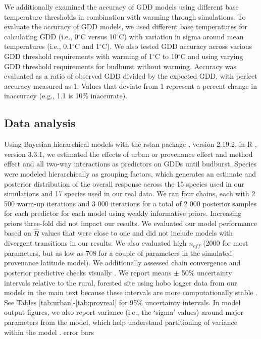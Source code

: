 \documentclass{article}\usepackage[]{graphicx}\usepackage[]{color}
\begin{document}
We additionally examined the accuracy of GDD models using different base temperature thresholds in combination with warming through simulations. To evaluate the accuracy of GDD models, we used different base temperatures for calculating GDD (i.e., 0$^{\circ}$C versus 10$^{\circ}$C) with variation in sigma around mean temperatures (i.e., 0.1$^{\circ}$C and 1$^{\circ}$C). We also tested GDD accuracy across various GDD threshold requirements with warming of 1$^{\circ}$C to 10$^{\circ}$C and using varying GDD threshold requirements for budburst without warming. Accuracy was evaluated as a ratio of observed GDD divided by the expected GDD, with perfect accuracy measured as 1. Values that deviate from 1 represent a percent change in inaccuracy (e.g., 1.1 is 10\% inaccurate).  

\subsection*{Data analysis}
Using Bayesian hierarchical models with the rstan package \citep{rstan2019}, version 2.19.2,  in R \citep{R}, version 3.3.1, we estimated the effects of urban or provenance effect and method effect and all two-way interactions as predictors on GDDs until budburst. Species were modeled hierarchically as grouping factors, which generates an estimate and posterior distribution of the overall response across the 15 species used in our simulations and 17 species used in our real data. We ran four chains, each with 2 500 warm-up iterations and 3 000 iterations for a total of 2 000 posterior samples for each predictor for each model using weakly informative priors. Increasing priors three-fold did not impact our results. We evaluated our model performance based on $\hat{R}$ values that were close to one and did not include models with divergent transitions in our results. We also evaluated high $n_{eff}$ (2000 for most parameters, but as low as 708 for a couple of parameters in the simulated provenance latitude model). We additionally assessed chain convergence and posterior predictive checks visually \citep{BDA}. We report means $\pm$ 50\% uncertainty intervals relative to the rural, forested site using hobo logger data from our models in the main text because these intervals are more computationally stable \citep{BDA,Carpenter2017}. See Tables \ref{tab:urban}-\ref{tab:provreal} for 95\% uncertainty intervals. In model output figures, we also report variance (i.e., the `sigma' values) around major parameters from the model, which help understand partitioning of variance within the model \citep{BDA}. 
error bars
\end{document}
